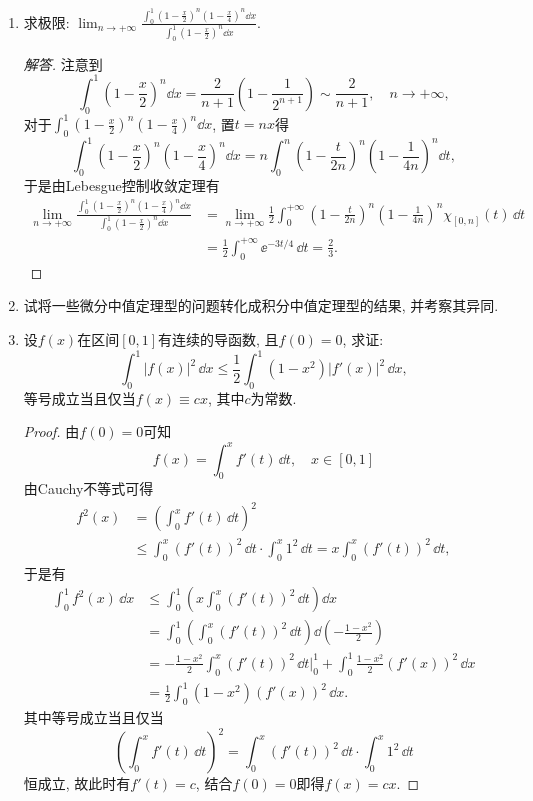 \begin{quizb}
\begin{enumerate}
\item 求极限: \(\lim_{n\rightarrow+\infty}\frac{\displaystyle\int_{0}^{1}\left(1-\frac{x}{2}\right)^n\left(1-\frac{x}{4}\right)^n\dd x}{\displaystyle\int_{0}^{1}\left(1-\frac{x}{2}\right)^n\dd x}\).
\begin{proof}[解答]
注意到\[\int_{0}^{1}\left(1-\frac{x}{2}\right)^n\dd x
=\frac{2}{n+1}\left(1-\frac{1}{2^{n+1}}\right)\sim\frac{2}{n+1},\quad n\rightarrow+\infty,\]
对于\(\int_{0}^{1}\left(1-\frac{x}{2}\right)^n\left(1-\frac{x}{4}\right)^n\dd x\), 
置\(t=nx\)得\[\int_{0}^{1}\left(1-\frac{x}{2}\right)^n\left(1-\frac{x}{4}\right)^n\dd x
=n\int_{0}^{n}\left(1-\frac{t}{2n}\right)^n\left(1-\frac{1}{4n}\right)^n\dd t,\]
于是由Lebesgue控制收敛定理有\[\begin{split}
\lim_{n\rightarrow+\infty}\frac{\displaystyle\int_{0}^{1}\left(1-\frac{x}{2}\right)^n\left(1-\frac{x}{4}\right)^n\dd x}{\displaystyle\int_{0}^{1}\left(1-\frac{x}{2}\right)^n\dd x}
&=\lim_{n\rightarrow+\infty}\frac{1}{2}\int_{0}^{+\infty}\left(1-\frac{t}{2n}\right)^n\left(1-\frac{1}{4n}\right)^n\chi_{[0,n]}(t)\,\dd t\\
&=\frac{1}{2}\int_{0}^{+\infty}\ee^{-3t/4}\,\dd t=\frac{2}{3}.
\end{split}\]
\end{proof}

\item 试将一些微分中值定理型的问题转化成积分中值定理型的结果, 并考察其异同.

\item 设\(f(x)\)在区间\([0,1]\)有连续的导函数, 且\(f(0)=0\), 求证:
\[\int_{0}^{1}|f(x)|^2\,\dd x\leqslant\frac{1}{2}\int_{0}^{1}(1-x^2)|f'(x)|^2\,\dd x,\]
等号成立当且仅当\(f(x)\equiv cx\), 其中\(c\)为常数.
\begin{proof}
由\(f(0)=0\)可知\[f(x)=\int_{0}^{x}f'(t)\,\dd t,\quad x\in[0,1]\]由Cauchy不等式可得
\begin{align*}f^2(x)&=\left(\int_{0}^{x}f'(t)\,\dd t\right)^2\\
&\leqslant \int_{0}^{x}(f'(t))^2\,\dd t\cdot\int_{0}^{x}1^2\,\dd t
=x\int_{0}^{x}(f'(t))^2\,\dd t,\end{align*}
于是有\[\begin{split}
\int_{0}^{1}f^2(x)\,\dd x&\leqslant\int_{0}^{1}\left(x\int_{0}^{x}(f'(t))^2\,\dd t\right)\dd x\\
&=\int_{0}^{1}\left(\int_{0}^{x}(f'(t))^2\,\dd t\right)\dd\left(-\frac{1-x^2}{2}\right)\\
&=-\frac{1-x^2}{2}\int_{0}^{x}(f'(t))^2\,\dd t\Big|_0^1+\int_{0}^{1}\frac{1-x^2}{2}(f'(x))^2\,\dd x\\
&=\frac{1}{2}\int_{0}^{1}(1-x^2)(f'(x))^2\,\dd x.
\end{split}\]
其中等号成立当且仅当\[\left(\int_{0}^{x}f'(t)\,\dd t\right)^2
=\int_{0}^{x}(f'(t))^2\,\dd t\cdot\int_{0}^{x}1^2\,\dd t\]
恒成立, 故此时有\(f'(t)=c\), 结合\(f(0)=0\)即得\(f(x)=cx\).
\end{proof}
\end{enumerate}
\end{quizb}

